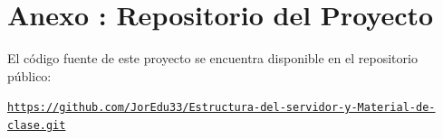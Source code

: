 \documentclass[letter,oneside,12pt,spanish]{report}
\begin{document}
\newpage

\chapter*{Anexo \thechapter: Repositorio del Proyecto}
\label{anexo:repositorio}

El código fuente de este proyecto se encuentra disponible en el repositorio público:

\begin{center}
\href{https://github.com/JorEdu33/Estructura-del-servidor-y-Material-de-clase.git}{\texttt{https://github.com/JorEdu33/Estructura-del-servidor-y-Material-de-clase.git}}
\end{center}

\makeatother
\egroup


\end{document}
